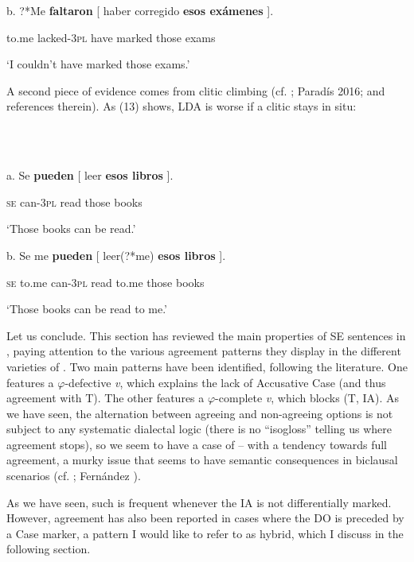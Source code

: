 \documentclass[output=paper]{langsci/langscibook}
\begin{document}
  b.   ?*Me      \textbf{faltaron}   [ haber  corregido \textbf{esos    exámenes} ].

            to.me  lacked\textsc{{}-3pl}  have   marked     those  exams

         ‘I couldn’t have marked those exams.’

A second piece of evidence comes from clitic climbing (cf. \citealt{Gallego2016}; Paradís 2016; and references therein). As (13) shows, LDA is worse if a clitic stays in situ:

\ea%
    \label{ex:key:13}
    \gll\\
        \\
    \glt
    \z

             a.   Se  \textbf{pueden}  [ leer   \textbf{esos    libros} ].

                  \textsc{se} can\textsc{{}-3pl}   read  those  books

        ‘Those books can be read.’

  b.   Se   me      \textbf{pueden}  [ leer(?*me)    \textbf{esos    libros} ].

         \textsc{se} to.me  can\textsc{{}-3pl}    read   to.me  those  books

         ‘Those books can be read to me.’

Let us conclude. This section has reviewed the main properties of SE sentences in , paying attention to the various agreement patterns they display in the different varieties of . Two main patterns have been identified, following the literature. One features a $\varphi $-defective \textit{v}, which explains the lack of Accusative Case (and thus agreement with T). The other features a $\varphi $-complete \textit{v}, which blocks  (T, IA). As we have seen, the alternation between agreeing and non-agreeing options is not subject to any systematic dialectal logic (there is no “isogloss” telling us where agreement stops), so we seem to have a case of  – with a tendency towards full agreement, a murky issue that seems to have semantic consequences in biclausal scenarios (cf. \citet{Martin1998}; Fernández \citealt{Serrano2016}). 

  As we have seen, such  is frequent whenever the IA is not differentially marked. However, agreement has also been reported in cases where the DO is preceded by a Case marker, a pattern I would like to refer to as hybrid, which I discuss in the following section.
\end{document}
